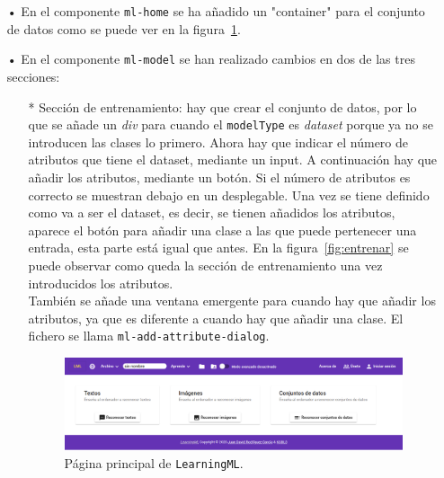 \documentclass[a4paper, 12pt]{book}
\begin{document}
\begin{itemize}
	\item[•] En el componente \texttt{ml-home} se ha añadido un "container" para el conjunto de datos como se puede ver en la figura~\ref{fig:pagina_principal}.
	\item[•] En el componente \texttt{ml-model} se han realizado cambios en dos de las tres secciones:
	\begin{itemize}
		\item[*] Sección de entrenamiento: hay que crear el conjunto de datos, por lo que se añade un \emph{div} para cuando el \texttt{modelType} es \emph{dataset} porque ya no se introducen las clases lo primero. 
		Ahora hay que indicar el número de atributos que tiene el dataset, mediante un input. 
		A continuación hay que añadir los atributos, mediante un botón. 
		Si el número de atributos es correcto se muestran debajo en un desplegable. 
		Una vez se tiene definido como va a ser el dataset, es decir, se tienen añadidos los atributos, aparece el botón para añadir una clase a las que puede pertenecer una entrada, esta parte está igual que antes. 
		En la figura~\ref{fig:entrenar} se puede observar como queda la sección de entrenamiento una vez introducidos los atributos.\\
		También se añade una ventana emergente para cuando hay que añadir los atributos, ya que es diferente a cuando hay que añadir una clase. El fichero se llama \texttt{ml-add-attribute-dialog}.

\begin{figure}
	\centering 
	\includegraphics[width=13cm, keepaspectratio]{img/pag_principal.png}
	\caption{Página principal de \texttt{LearningML}.} \label{fig:pagina_principal}
\end{figure}


\end{itemize}
\end{itemize}
\end{document}
